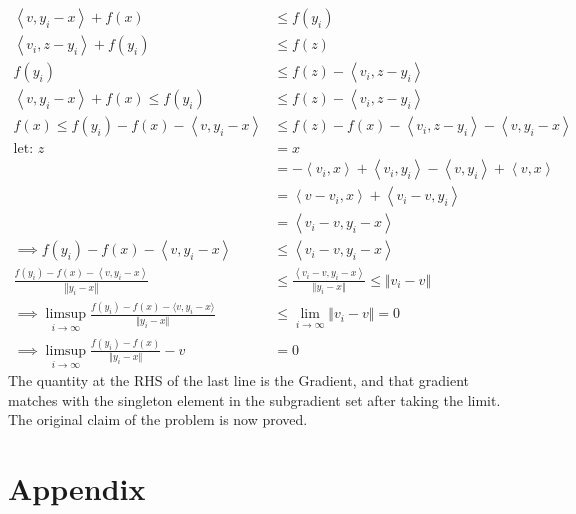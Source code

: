 \documentclass[]{article}
\begin{document}
    \begin{align*}\tag{3.54.7}\label{eqn:3.54.7}
        \left\langle v, y_i - x \right\rangle + f(x) & \le f(y_i) 
        \\
        \left\langle v_i, z - y_i \right\rangle + f(y_i) &\le f(z)
        \\
        f(y_i) &\le f(z) - \left\langle v_i, z - y_i \right\rangle
        \\
        \left\langle v, y_i - x \right\rangle + f(x) \le f(y_i) &\le f(z) - \left\langle  v_i, z - y_i \right\rangle
        \\
        f(x) \le  f(y_i) - f(x) - \left\langle v, y_i - x \right\rangle & \le  f(z) - f(x) - \left\langle v_i, z - y_i \right\rangle - \left\langle v, y_i - x \right\rangle
        \\
        \text{let: } z &= x
        \\
        &= - \left\langle v_i, x \right\rangle
        + \left\langle v_i, y_i \right\rangle
        - 
        \left\langle v, y_i \right\rangle + 
        \left\langle v, x \right\rangle
        \\
        &= \left\langle v - v_i, x \right\rangle + \left\langle v_i - v, y_i \right\rangle 
        \\
        &= \left\langle v_i - v, y_i - x \right\rangle
        \\
        \implies
        f(y_i) - f(x) - \left\langle v, y_i - x \right\rangle &\le \left\langle v_i - v, y_i - x \right\rangle
        \\
        \frac{f(y_i) - f(x) - \left\langle v, y_i - x \right\rangle}{\left\Vert
            y_i - x
        \right\Vert} 
        &\le \frac{\left\langle v_i - v, y_i - x \right\rangle}{\Vert y_i - x\Vert} \le \Vert v_i - v\Vert
        \\
        \implies 
        \limsup_{i\rightarrow \infty}  \frac{f(y_i) - f(x) - \langle v, y_i - x\rangle}{\Vert y_i - x\Vert} 
        &\le \lim_{i\rightarrow \infty} \Vert v_i - v\Vert = 0
        \\
        \implies \limsup_{i\rightarrow \infty} \frac{f(y_i) - f(x)}{\Vert y_i - x\Vert} - v &= 0
    \end{align*}
    The quantity at the RHS of the last line is the Gradient, and that gradient matches with the singleton element in the subgradient set after taking the limit. The original claim of the problem is now proved. 


\section{Appendix}
\end{document}
